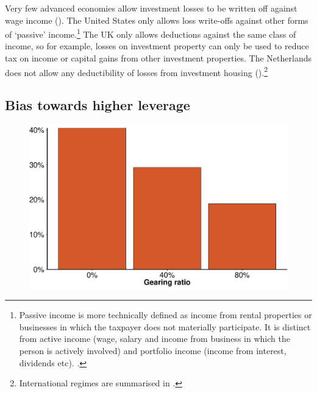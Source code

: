 \documentclass{grattanAlpha}\usepackage[]{graphicx}\usepackage[]{color}
\begin{document}
Very few advanced economies allow investment losses to be written off against wage income (). 
The United States only allows loss write-offs against other forms of ‘passive’ income.\footnote{Passive income\label{footnote:passive-income} is more technically defined as income from rental properties or businesses in which the taxpayer does not materially participate. It is distinct from active income (wage, salary and income from business in which the person is actively involved) and portfolio income (income from interest, dividends etc). \textcite[See:]{IRS2015}.} 
The UK only allows deductions against the same class of income, so for example, losses on investment property can only be used to reduce tax on income or capital gains from other investment properties. 
The Netherlands does not allow any deductibility of losses from investment housing ().\footnote{International regimes are summarised in \textcites[][43]{RBA2014SubmissionAffordableHousingInquiry}[][86]{ProductivityCommission2004FirstHomeOwnership}[][92--95]{ODonnell2005}.}

\subsection{Bias towards higher leverage}
\begin{figure}
\label{fig:EMTR-by-gearing}

\includegraphics[width=\columnwidth]{CGT-NG-atlas//EMTR-by-gearing-1}

\end{figure}
\end{document}
